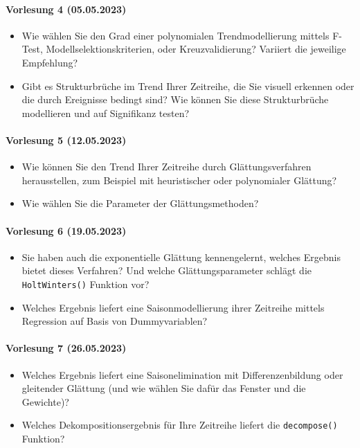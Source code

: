 \paragraph{Vorlesung 4 (05.05.2023)}
\begin{itemize}
    \item Wie wählen Sie den Grad einer polynomialen Trendmodellierung mittels F-Test, Modellselektionskriterien, oder Kreuzvalidierung? Variiert die jeweilige Empfehlung?
    \item Gibt es Strukturbrüche im Trend Ihrer Zeitreihe, die Sie visuell erkennen oder die durch Ereignisse bedingt sind? Wie können Sie diese Strukturbrüche modellieren und auf Signifikanz testen?
\end{itemize}

\paragraph{Vorlesung 5 (12.05.2023)}
\begin{itemize}
    \item Wie können Sie den Trend Ihrer Zeitreihe durch Glättungsverfahren herausstellen, zum Beispiel mit heuristischer oder polynomialer Glättung? 
    \item Wie wählen Sie die Parameter der Glättungsmethoden?
\end{itemize}

\paragraph{Vorlesung 6 (19.05.2023)}
\begin{itemize}
    \item Sie haben auch die exponentielle Glättung kennengelernt, welches Ergebnis bietet dieses Verfahren? Und welche Glättungsparameter schlägt die \texttt{HoltWinters()} Funktion vor?
    \item Welches Ergebnis liefert eine Saisonmodellierung ihrer Zeitreihe mittels Regression auf Basis von Dummyvariablen?
\end{itemize}

\paragraph{Vorlesung 7 (26.05.2023)}
\begin{itemize}
    \item Welches Ergebnis liefert eine Saisonelimination mit Differenzenbildung oder gleitender Glättung (und wie wählen Sie dafür das Fenster und die Gewichte)?
    \item Welches Dekompositionsergebnis für Ihre Zeitreihe liefert die \texttt{decompose()} Funktion?
\end{itemize}

